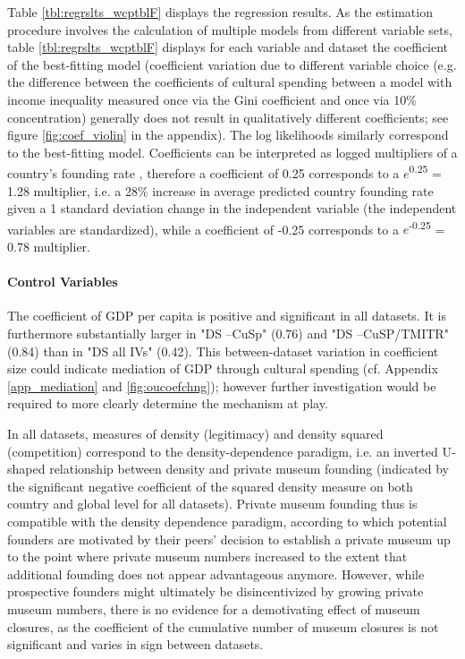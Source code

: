 \documentclass[11pt]{article}
\begin{document}
Table \ref{tbl:regrslts_wcptblF} displays the regression results. 
As the estimation procedure involves the calculation of multiple models from different variable sets, table \ref{tbl:regrslts_wcptblF} displays for each variable and dataset the coefficient of the best-fitting model (coefficient variation due to different variable choice (e.g. the difference between the coefficients of cultural spending between a model with income inequality measured once via the Gini coefficient and once via 10\% concentration) generally does not result in qualitatively different coefficients; see figure \ref{fig:coef_violin} in the appendix). 
The log likelihoods similarly correspond to the best-fitting model. 
Coefficients can be interpreted as logged multipliers of a country's founding rate \parencite{Coxe_West_Aiken_2009_count}, therefore a coefficient of 0.25 corresponds to a \(e\)\textsuperscript{0.25} = 1.28 multiplier, i.e. a 28\% increase in average predicted country founding rate given a 1 standard deviation change in the independent variable (the independent variables are standardized), while a coefficient of -0.25 corresponds to a \(e\)\textsuperscript{-0.25} = 0.78 multiplier.



\paragraph*{Control Variables}





The coefficient of GDP per capita is positive and significant in all datasets. 
It is furthermore substantially larger in "DS --CuSp" (0.76) and "DS --CuSP/TMITR" (0.84) than in "DS all IVs" (0.42).
This between-dataset variation in coefficient size could indicate mediation of GDP through cultural spending (cf. Appendix \ref{app_mediation} and \ref{fig:oucoefchng}); however further investigation would be required to more clearly determine the mechanism at play. 





In all datasets, measures of density (legitimacy) and density squared (competition) correspond to the density-dependence paradigm, i.e. an inverted U-shaped relationship between density and private museum founding (indicated by the significant negative coefficient of the squared density measure on both country and global level for all datasets). 
Private museum founding thus is compatible with the density dependence paradigm, according to which potential founders are motivated by their peers' decision to establish a private museum up to the point where private museum numbers increased to the extent that additional founding does not appear advantageous anymore. 
However, while prospective founders might ultimately be disincentivized by growing private museum numbers, there is no evidence for a demotivating effect of  museum closures, as the coefficient of the cumulative number of museum closures is not significant and varies in sign between datasets.
\end{document}
